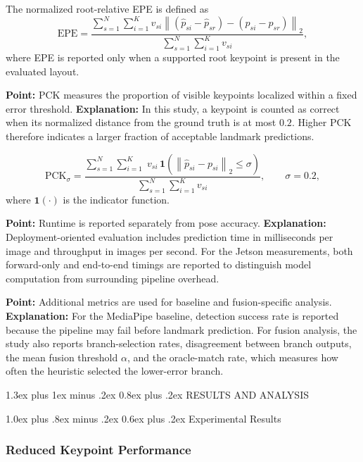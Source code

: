 \documentclass[10pt,letterpaper]{article}
\makeatletter
\renewcommand\section{\@startsection{section}{1}{\z@}%
  {1.3ex plus 1ex minus .2ex}%
  {0.8ex plus .2ex}%
  {\centering\normalfont\small\scshape}}
\renewcommand\subsection{\@startsection{subsection}{2}{\z@}%
  {1.0ex plus .8ex minus .2ex}%
  {0.6ex plus .2ex}%
  {\normalfont\itshape}}
\makeatother
\begin{document}
The normalized root-relative EPE is defined as
\[
\mathrm{EPE} =
\frac{
\sum_{s=1}^{N}
\sum_{i=1}^{K}
v_{si}
\left\|
(\hat{p}_{si} - \hat{p}_{sr}) - (p_{si} - p_{sr})
\right\|_2
}{
\sum_{s=1}^{N}
\sum_{i=1}^{K}
v_{si}
},
\]
where EPE is reported only when a supported root keypoint is present in the evaluated layout.

\medskip
\noindent\textbf{Point:} PCK measures the proportion of visible keypoints localized within a fixed error threshold.  
\textbf{Explanation:} In this study, a keypoint is counted as correct when its normalized distance from the ground truth is at most $0.2$. Higher PCK therefore indicates a larger fraction of acceptable landmark predictions.

\[
\mathrm{PCK}_{\sigma} =
\frac{
\sum_{s=1}^{N}
\sum_{i=1}^{K}
\;v_{si}\,\mathbf{1}
\left(
\left\|
\hat{p}_{si} - p_{si}
\right\|_2 \le \sigma
\right)
}{
\sum_{s=1}^{N}
\sum_{i=1}^{K}
v_{si}
},
\qquad \sigma = 0.2,
\]
where $\mathbf{1}(\cdot)$ is the indicator function.

\medskip
\noindent\textbf{Point:} Runtime is reported separately from pose accuracy.  
\textbf{Explanation:} Deployment-oriented evaluation includes prediction time in milliseconds per image and throughput in images per second. For the Jetson measurements, both forward-only and end-to-end timings are reported to distinguish model computation from surrounding pipeline overhead.

\medskip
\noindent\textbf{Point:} Additional metrics are used for baseline and fusion-specific analysis.  
\textbf{Explanation:} For the MediaPipe baseline, detection success rate is reported because the pipeline may fail before landmark prediction. For fusion analysis, the study also reports branch-selection rates, disagreement between branch outputs, the mean fusion threshold $\alpha$, and the oracle-match rate, which measures how often the heuristic selected the lower-error branch.

\section{RESULTS AND ANALYSIS}

\subsection{Experimental Results}

\subsubsection{Reduced Keypoint Performance}
\end{document}
